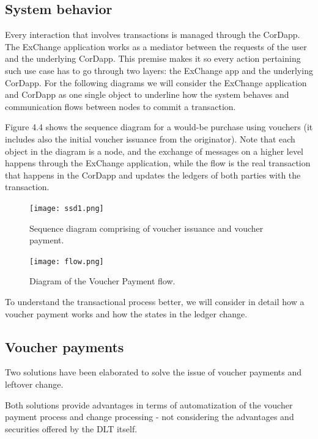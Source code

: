 \newpage

\subsection{System behavior}

Every interaction that involves transactions is managed through the CorDapp. The ExChange application works as a mediator between the requests of the user and the underlying CorDapp. This premise makes it so every action pertaining such use case has to go through two layers: the ExChange app and the underlying CorDapp. 
For the following diagrams we will consider the ExChange application and CorDapp as one single object to underline how the system behaves and communication flows between nodes to commit a transaction.

Figure 4.4 shows the sequence diagram for a would-be purchase using vouchers (it includes also the initial voucher issuance from the originator).
Note that each object in the diagram is a node, and the exchange of messages on a higher level happens through the ExChange application, while the flow is the real transaction that happens in the CorDapp and updates the ledgers of both parties with the transaction.

\begin{figure}[h]
    \centering
    \texttt{[image: ssd1.png]}
    \caption{
       Sequence diagram comprising of voucher issuance and voucher payment.
        }
\end{figure}

\begin{figure}[h]
    \centering
    \texttt{[image: flow.png]}
    \caption{
       Diagram of the Voucher Payment flow.
        }
\end{figure}



To understand the transactional process better, we will consider in detail how a voucher payment works and how the states in the ledger change.

\subsection{Voucher payments}

Two solutions have been elaborated to solve the issue of voucher payments and leftover change.

Both solutions provide advantages in terms of automatization of the voucher payment process and change processing - not considering the advantages and securities offered by the DLT itself.

